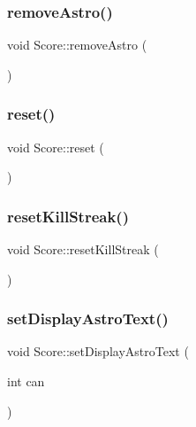 \mbox{\label{class_score_ac826af8103f602c71d75d36aeecdff35}} 
\subsubsection{\texorpdfstring{remove\+Astro()}{removeAstro()}}
{\footnotesize\ttfamily void Score\+::remove\+Astro (\begin{DoxyParamCaption}{ }\end{DoxyParamCaption})}

\mbox{\label{class_score_a32804ba9a847e58160e6e0cef46e1f25}} 
\subsubsection{\texorpdfstring{reset()}{reset()}}
{\footnotesize\ttfamily void Score\+::reset (\begin{DoxyParamCaption}{ }\end{DoxyParamCaption})}

\mbox{\label{class_score_a152a46eb1f165db706409369d4da7959}} 
\subsubsection{\texorpdfstring{reset\+Kill\+Streak()}{resetKillStreak()}}
{\footnotesize\ttfamily void Score\+::reset\+Kill\+Streak (\begin{DoxyParamCaption}{ }\end{DoxyParamCaption})}

\mbox{\label{class_score_a3b9b2184527917932481449f410ab3ed}} 
\subsubsection{\texorpdfstring{set\+Display\+Astro\+Text()}{setDisplayAstroText()}}
{\footnotesize\ttfamily void Score\+::set\+Display\+Astro\+Text (\begin{DoxyParamCaption}\item[{int}]{can }\end{DoxyParamCaption})}

